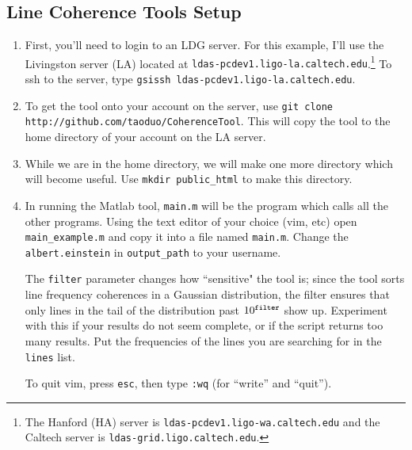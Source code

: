 \documentclass[11pt]{article}
\begin{document}
\subsection*{Line Coherence Tools Setup}
\begin{enumerate}
	\item First, you'll need to login to an LDG server. For this example, I'll use the Livingston server (LA) located at {\tt ldas-pcdev1.ligo-la.caltech.edu}.\footnote{The Hanford (HA) server is {\tt ldas-pcdev1.ligo-wa.caltech.edu} and the Caltech server is {\tt ldas-grid.ligo.caltech.edu}.} To ssh to the server, type {\tt gsissh ldas-pcdev1.ligo-la.caltech.edu}.
	\item To get the tool onto your account on the server, use {\tt  git clone \break http://github.com/taoduo/CoherenceTool}. This will copy the tool to the home directory of your account on the LA server.
	\item While we are in the home directory, we will make one more directory which will become useful. Use {\tt mkdir public\_html} to make this directory.
    \item In running the Matlab tool, {\tt main.m} will be the program which calls all the other programs. Using the text editor of your choice (vim, etc) open {\tt main\_example.m} and copy it into a file named {\tt main.m}. Change the {\tt albert.einstein} in {\tt output\_path} to your username.

The {\tt filter} parameter changes how ``sensitive" the tool is; since the tool sorts line frequency coherences in a Gaussian distribution, the filter ensures that only lines in the tail of the distribution past $10^{\tt filter}$ show up. Experiment with this if your results do not seem complete, or if the script returns too many results. Put the frequencies of the lines you are searching for in the {\tt lines} list.

To quit vim, press {\tt esc}, then type {\tt :wq} (for ``write'' and ``quit'').
\end{enumerate}


\lstset{language=html}
\end{document}
